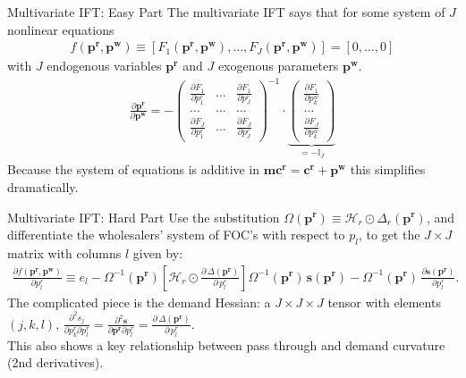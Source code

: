 \begin{frame}{Multivariate IFT: Easy Part}
The multivariate IFT says that for some system of $J$ nonlinear equations 
\begin{align*}
f(\symbf{p^r},\symbf{p^w}) \equiv [F_1(\symbf{p^r},\symbf{p^w}), \ldots, F_J(\symbf{p^r},\symbf{p^w})]=[0,\ldots,0]
\end{align*}
with $J$ endogenous variables $\symbf{p^r}$ and $J$ exogenous parameters $\symbf{p^w}$.
\begin{align}
\label{eq:ptr_matrix}
\tag{PTR}
\frac{\partial \symbf{p^r}}{\partial \symbf{p^w}}
=-\left(\begin{array}{ccc}
\frac{\partial F_{1}}{\partial p_{1}^r} & \ldots & \frac{\partial F_{1}}{\partial p_{J}^r} \\
\ldots & \ldots & \ldots \\
\frac{\partial F_{J}}{\partial p_{1}^r} & \ldots & \frac{\partial F_{J}}{\partial p_{J}^r}
\end{array}\right)^{-1} \cdot \underbrace{\left(\begin{array}{l}
\frac{\partial F_{1}}{\partial p_{k}^w} \\
\ldots \\
\frac{\partial F_{J}}{\partial p_{k}^w}
\end{array}\right)}_{= -\mathbb{I}_J}
\end{align}
Because the system of equations is additive in $\symbf{mc^r} = \symbf{c^r} + \symbf{p^w}$ this simplifies dramatically.
\end{frame}


\begin{frame}{Multivariate IFT: Hard Part}
Use the substitution $\Omega(\symbf{p^r}) \equiv \mathcal{H}_r \odot \Delta_{r}(\symbf{p^r})$, and differentiate the wholesalers' system of FOC's with respect to $p_l$, to get the $J \times J$ matrix with columns $l$ given by:
\begin{align}
\frac{\partial f(\symbf{p^r},\symbf{p^w})}{\partial p_l^r} \equiv e_l - \Omega^{-1}(\symbf{p^r})
\left[  \mathcal{H}_{r} \odot \frac{\partial\, \Delta(\symbf{p^r})}{\partial\, p_l^r} \right]
\Omega^{-1}(\symbf{p^r})\,
\symbf{s}(\symbf{p^r}) -\Omega^{-1}(\symbf{p^r})\, \frac{\partial \symbf{s}(\symbf{p^r})}{\partial p_l^r}.
\end{align}
The complicated piece is the demand Hessian: a $J \times J \times J$ tensor with elements $(j,k,l)$, $\frac{\partial^2 s_j}{\partial p_k^r \partial p_l^r} = \frac{\partial^2 \symbf{s}}{\partial \symbf{p^r} \partial p_l^r}=\frac{\partial\, \Delta(\symbf{p^r})}{\partial\, p_l^r}$.\\

This also shows a key relationship between \alert{pass through} and \alert{demand curvature} (2nd derivatives).
\end{frame}



